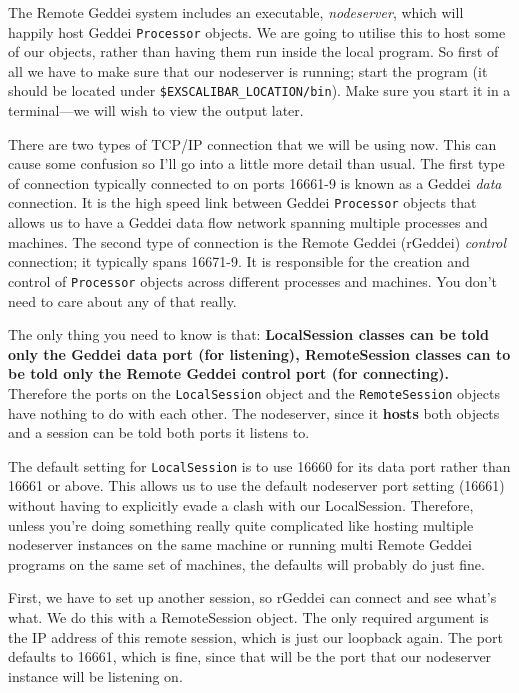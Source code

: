 The Remote Geddei system includes an executable, \textit{nodeserver}, which will happily host Geddei \texttt{Processor} objects. We are going to utilise this to host some of our objects, rather than having them run inside the local program. So first of all we have to make sure that our nodeserver is running; start the program (it should be located under \texttt{\$EXSCALIBAR\_LOCATION/bin}). Make sure you start it in a terminal---we will wish to view the output later.

There are two types of TCP/IP connection that we will be using now. This can cause some confusion so I'll go into a little more detail than usual. The first type of connection typically connected to on ports 16661-9 is known as a Geddei \textit{data} connection. It is the high speed link between Geddei \texttt{Processor} objects that allows us to have a Geddei data flow network spanning multiple processes and machines. The second type of connection is the Remote Geddei (rGeddei) \textit{control} connection; it typically spans 16671-9. It is responsible for the creation and control of \texttt{Processor} objects across different processes and machines. You don't need to care about any of that really.

The only thing you need to know is that: \textbf{LocalSession classes can be told only the Geddei data port (for listening), RemoteSession classes can to be told only the Remote Geddei control port (for connecting).} Therefore the ports on the \texttt{LocalSession} object and the \texttt{RemoteSession} objects have nothing to do with each other. The nodeserver, since it \textbf{hosts} both objects and a session can be told both ports it listens to.

The default setting for \texttt{LocalSession} is to use 16660 for its data port rather than 16661 or above. This allows us to use the default nodeserver port setting (16661) without having to explicitly evade a clash with our LocalSession. Therefore, unless you're doing something really quite complicated like hosting multiple nodeserver instances on the same machine or running multi Remote Geddei programs on the same set of machines, the defaults will probably do just fine.

First, we have to set up another session, so rGeddei can connect and see what's what. We do this with a RemoteSession object. The only required argument is the IP address of this remote session, which is just our loopback again. The port defaults to 16661, which is fine, since that will be the port that our nodeserver instance will be listening on.

